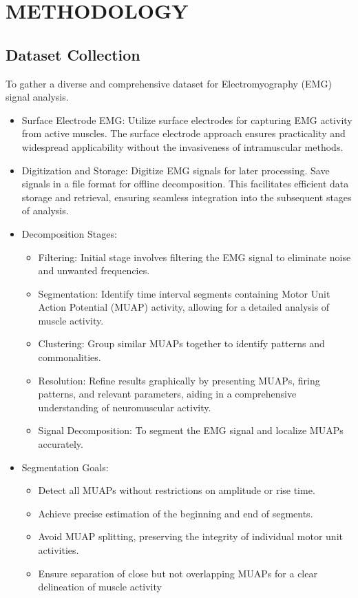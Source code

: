 \documentclass[ 12pt,a4paper,twocolumn,fleqn]{report}
\begin{document}
\chapter{METHODOLOGY}
\section{Dataset Collection}
\vspace{2mm}
To gather a diverse and comprehensive dataset for Electromyography (EMG) signal analysis.
\begin{itemize}
    \item Surface Electrode EMG: Utilize surface electrodes for capturing EMG activity from active
muscles. The surface electrode approach ensures practicality and widespread applicability
without the invasiveness of intramuscular methods.
\item Digitization and Storage: Digitize EMG signals for later processing. Save signals in a file
format for offline decomposition. This facilitates efficient data storage and retrieval, ensuring
seamless integration into the subsequent stages of analysis.
\item Decomposition Stages:
\begin{itemize}
\item  Filtering: Initial stage involves filtering the EMG signal to eliminate noise and unwanted
frequencies.
\item  Segmentation: Identify time interval segments containing Motor Unit Action Potential
(MUAP) activity, allowing for a detailed analysis of muscle activity.
\item  Clustering: Group similar MUAPs together to identify patterns and commonalities.
\item  Resolution: Refine results graphically by presenting MUAPs, firing patterns, and
relevant parameters, aiding in a comprehensive understanding of neuromuscular
activity.
\item  Signal Decomposition: To segment the EMG signal and localize MUAPs accurately.

\end{itemize}
\end{itemize}

\newpage
  \pagestyle{fancy}
\thisfancypage{%
  \setlength{\fboxsep}{20pt}\doublebox}{}
\normalsize
\begin{itemize}
    \item Segmentation Goals:
    \begin{itemize}
    \item Detect all MUAPs without restrictions on amplitude or rise time.
\item Achieve precise estimation of the beginning and end of segments.
\item Avoid MUAP splitting, preserving the integrity of individual motor unit activities.
\item Ensure separation of close but not overlapping MUAPs for a clear delineation of muscle
activity
    \end{itemize}
\end{itemize}
\end{document}
